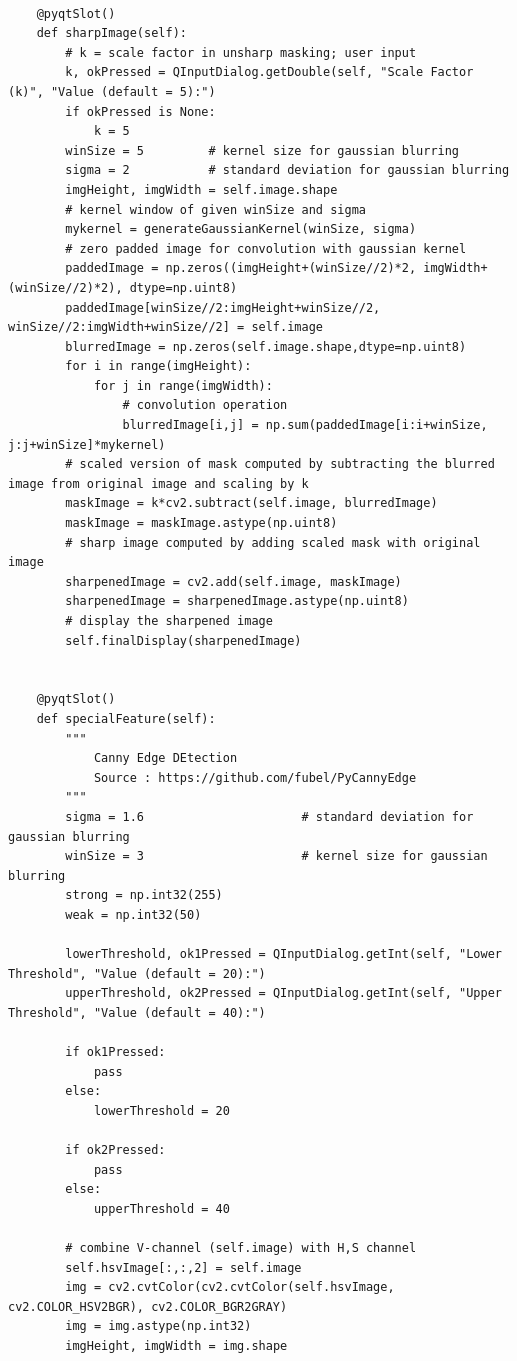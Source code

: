 \documentclass[letterpaper, 10 pt, conference]{ieeeconf}  %
\begin{document}
\begin{mdframed}
\begin{lstlisting}
    
    @pyqtSlot()
    def sharpImage(self):
        # k = scale factor in unsharp masking; user input
        k, okPressed = QInputDialog.getDouble(self, "Scale Factor (k)", "Value (default = 5):") 
        if okPressed is None:
            k = 5
        winSize = 5         # kernel size for gaussian blurring
        sigma = 2           # standard deviation for gaussian blurring
        imgHeight, imgWidth = self.image.shape
        # kernel window of given winSize and sigma
        mykernel = generateGaussianKernel(winSize, sigma)
        # zero padded image for convolution with gaussian kernel
        paddedImage = np.zeros((imgHeight+(winSize//2)*2, imgWidth+(winSize//2)*2), dtype=np.uint8)
        paddedImage[winSize//2:imgHeight+winSize//2, winSize//2:imgWidth+winSize//2] = self.image
        blurredImage = np.zeros(self.image.shape,dtype=np.uint8)
        for i in range(imgHeight):
            for j in range(imgWidth):
                # convolution operation
                blurredImage[i,j] = np.sum(paddedImage[i:i+winSize, j:j+winSize]*mykernel)    
        # scaled version of mask computed by subtracting the blurred image from original image and scaling by k
        maskImage = k*cv2.subtract(self.image, blurredImage)
        maskImage = maskImage.astype(np.uint8)
        # sharp image computed by adding scaled mask with original image
        sharpenedImage = cv2.add(self.image, maskImage)
        sharpenedImage = sharpenedImage.astype(np.uint8)
        # display the sharpened image 
        self.finalDisplay(sharpenedImage)

        
    @pyqtSlot()
    def specialFeature(self):
        """
            Canny Edge DEtection
            Source : https://github.com/fubel/PyCannyEdge
        """
        sigma = 1.6                      # standard deviation for gaussian blurring 
        winSize = 3                      # kernel size for gaussian blurring
        strong = np.int32(255)
        weak = np.int32(50)

        lowerThreshold, ok1Pressed = QInputDialog.getInt(self, "Lower Threshold", "Value (default = 20):")
        upperThreshold, ok2Pressed = QInputDialog.getInt(self, "Upper Threshold", "Value (default = 40):")

        if ok1Pressed:
            pass
        else:
            lowerThreshold = 20

        if ok2Pressed:
            pass
        else:
            upperThreshold = 40

        # combine V-channel (self.image) with H,S channel
        self.hsvImage[:,:,2] = self.image
        img = cv2.cvtColor(cv2.cvtColor(self.hsvImage, cv2.COLOR_HSV2BGR), cv2.COLOR_BGR2GRAY)
        img = img.astype(np.int32)
        imgHeight, imgWidth = img.shape


\end{lstlisting}
\end{mdframed}
\end{document}

